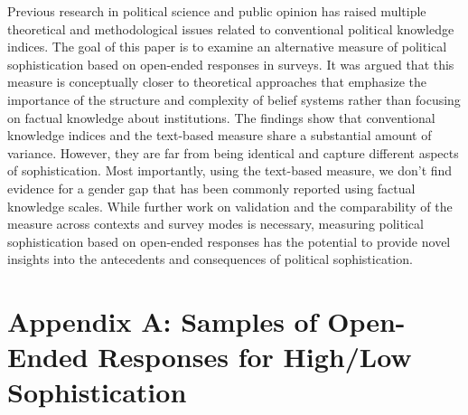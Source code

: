\documentclass[12pt]{article}
\begin{document}
Previous research in political science and public opinion has raised multiple theoretical and methodological issues related to conventional political knowledge indices. The goal of this paper is to examine an alternative measure of political sophistication based on open-ended responses in surveys. It was argued that this measure is conceptually closer to theoretical approaches that emphasize the importance of the structure and complexity of belief systems rather than focusing on factual knowledge about institutions. The findings show that conventional knowledge indices and the text-based measure share a substantial amount of variance. However, they are far from being identical and capture different aspects of sophistication. Most importantly, using the text-based measure, we don't find evidence for a gender gap that has been commonly reported using factual knowledge scales. While further work on validation and the comparability of the measure across contexts and survey modes is necessary, measuring political sophistication based on open-ended responses has the potential to provide novel insights into the antecedents and consequences of political sophistication.


\clearpage\singlespacing\footnotesize



\clearpage
\section*{Appendix A: Samples of Open-Ended Responses for High/Low Sophistication}\label{app:soph}
\end{document}
